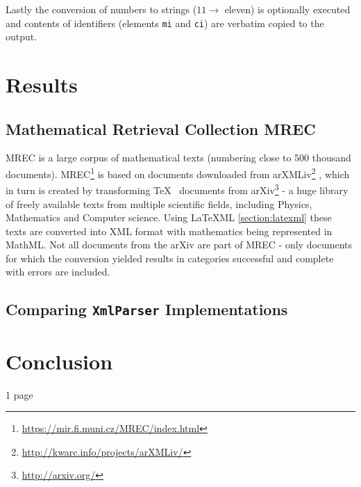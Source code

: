 \documentclass[11pt,oneside,final]{fithesis2}
\begin{document}
Lastly the conversion of numbers to strings ($11 \rightarrow$ eleven) is optionally executed and contents of identifiers (elements \texttt{mi} and \texttt{ci}) are verbatim copied to the output. 

\chapter{Results}
\section{Mathematical Retrieval Collection MREC}
\label{section:mrec}
MREC \cite{mrec:mrec2011} is a large corpus of mathematical texts (numbering close to 500 thousand documents). MREC\footnote{\url{https://mir.fi.muni.cz/MREC/index.html}} is based on documents downloaded from arXMLiv\footnote{\url{http://kwarc.info/projects/arXMLiv/}} \cite{mrec:arXMLiv2010}, which in turn is created by transforming \TeX~ documents from arXiv\footnote{\url{http://arxiv.org/}} - a huge library of freely available texts from multiple scientific fields, including Physics, Mathematics and Computer science. Using \LaTeX ML \ref{section:latexml} these texts are converted into XML format with mathematics being represented in MathML. Not all documents from the arXiv are part of MREC - only documents for which the conversion yielded results in categories successful and complete with errors are included.


\section{Comparing \texttt{XmlParser} Implementations}
\label{section:compareparsers}

\chapter{Conclusion}
1 page

\clearpage
{}


\end{document}
